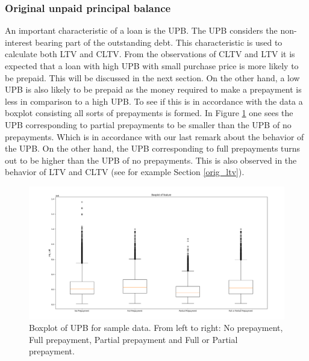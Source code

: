     \subsubsection{Original unpaid principal balance}
        An important characteristic of a loan is the UPB.
        The UPB considers the non-interest bearing part of the 
        outstanding debt.  
        This characteristic 
        is used to calculate both LTV and CLTV. From the 
        observations of CLTV and LTV it is expected that a loan 
        with high UPB with small purchase price is more likely 
        to be prepaid. This will be discussed in the next section. 
        On the other hand, a low UPB is also likely to be 
        prepaid as the money required to make a prepayment is 
        less in comparison to a high UPB. To see if this is in 
        accordance with the data a boxplot consisting all 
        sorts of prepayments is formed. In Figure 
        \ref{model_boxplot_UPB} one sees the UPB corresponding 
        to partial prepayments to be smaller than the UPB of no 
        prepayments. Which is in accordance with our last remark 
        about the behavior of the UPB. On the other hand, the 
        UPB corresponding to full prepayments turns out to be 
        higher than the UPB of no prepayments. This is also 
        observed in the behavior of LTV and CLTV (see 
        for example Section \ref{orig_ltv}). 
        \begin{figure}[H]
            \centering
            \includegraphics[width=\linewidth]{Figures/Boxplot_of_upb_[2013, 2014, 2015, 2016, 2017, 2018, 2019, 2020]_.png}
            \caption{
                Boxplot of UPB for sample data. From left to right: 
                No prepayment, Full prepayment, Partial prepayment 
                and Full or Partial prepayment.
                }
            \label{model_boxplot_UPB}
        \end{figure}
